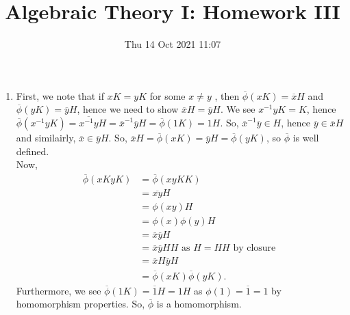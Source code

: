 \documentclass[a4paper]{article}
\title{Algebraic Theory I: Homework III}
\date{Thu 14 Oct 2021 11:07}
\begin{document}
\maketitle
\begin{solution}[1]
\begin{enumerate}
	\item First, we note that if \(xK = yK\) for some \(x \neq y\)  , then \(\overline{\phi}\left( xK \right) = \overline{x}H\) and \(\overline{\phi}\left( yK \right) = \overline{y}H\), hence we need to show \(\overline{x}H = \overline{y}H\). We see \(x^{-1}y K = K\), hence \(\overline{\phi}\left( x^{-1}yK \right) = \overline{x^{-1}y}H = \overline{x}^{-1} \overline{y} H = \overline{\phi}\left( 1K \right) = 1 H\). So, \(\overline{x}^{-1}\overline{y} \in H\), hence \(\overline{y} \in \overline{x}H\) and similairly, \(\overline{x} \in\overline{y}H\). So, \(\overline{x}H = \overline{\phi}\left( xK \right) = \overline{y}H = \overline{\phi}\left( yK \right) \), so \(\overline{\phi}\)  is well defined.\\
		Now,
		\begin{align*}
			\overline{\phi}\left( xK yK \right) &= \overline{\phi}\left( xyKK \right)  \\
			&=  \overline{xy} H\\
			&= \phi\left( xy \right) H\\
			&= \phi\left( x \right) \phi\left( y \right) H \\
			&= \overline{x} \overline{y} H\\
			&= \overline{x}\overline{y} H H \text{ as \(H = H H\) by closure }\\
		&= \overline{x} H \overline{y} H \\
		&= \overline{\phi}\left( xK \right) \overline{\phi}\left( yK \right)
		.\end{align*}
		Furthermore, we see \(\overline{\phi}\left( 1K \right) = \overline{1}H = 1H\) as \(\phi\left( 1 \right)  = \overline{1} = 1\)  by homomorphism properties. So, \(\overline{\phi}\) is a homomorphism.


\end{enumerate}
\end{solution}
\end{document}
